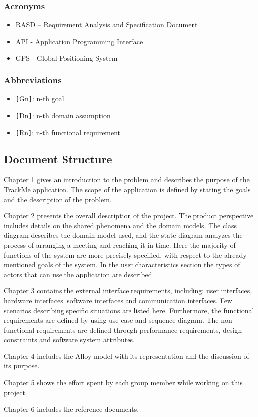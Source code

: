 \subsubsection{Acronyms}
\begin{itemize}
\item RASD – Requirement Analysis and Specification Document
\item API - Application Programming Interface
\item GPS - Global Positioning System
\end{itemize}
\subsubsection{Abbreviations}
\begin{itemize}
\item \verb|[|Gn\verb|]|: n-th goal
\item \verb|[|Dn\verb|]|: n-th domain assumption
\item \verb|[|Rn\verb|]|: n-th functional requirement
\end{itemize}

\subsection{Document Structure}
Chapter 1 gives an introduction to the problem and describes the purpose of the TrackMe application. The scope of the application is defined by stating the goals and the description of the problem.\newline

Chapter 2 presents the overall description of the project. The product perspective includes details on
the shared phenomena and the domain models. The class diagram describes the domain model used,
and the state diagram analyzes the process of arranging a meeting and reaching it in time. Here the
majority of functions of the system are more precisely specified, with respect to the already mentioned
goals of the system. In the user characteristics section the types of actors that can use the application
are described.\newline

Chapter 3 contains the external interface requirements, including: user interfaces, hardware interfaces,
software interfaces and communication interfaces. Few scenarios describing specific situations are listed
here. Furthermore, the functional requirements are defined by using use case and sequence diagram.
The non-functional requirements are defined through performance requirements, design constraints
and software system attributes.\newline

Chapter 4 includes the Alloy model with its representation and the discussion of its purpose.\newline

Chapter 5 shows the effort spent by each group member while working on this project.\newline

Chapter 6 includes the reference documents.

%